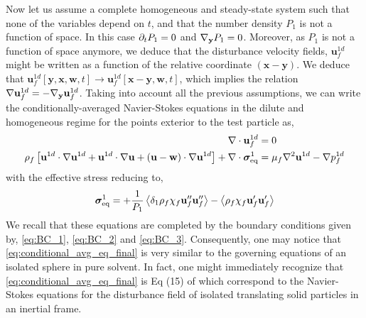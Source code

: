 Now let us assume a complete homogeneous and steady-state system such that none of the variables depend on $t$, and that the number density $P_1$ is not a function of space. 
In this case $\partial_t P_1 = 0$ and ${\mathbf{\nabla}_\textbf{y}} P_1 = 0$.
Moreover, as $P_1$ is not a function of space anymore, we deduce that the disturbance velocity fields, $\textbf{u}_f^{1d}$ might be written as a function of the relative coordinate $(\textbf{x} - \textbf{y})$. 
We deduce that $\textbf{u}_f^{1d}[\textbf{y},\textbf{x},\textbf{w},t] \to \textbf{u}_f^{1d}[\textbf{x}-\textbf{y},\textbf{w},t]$, which implies the relation  $\mathbf{\nabla} \textbf{u}_f^{1d} = - {\mathbf{\nabla}_\textbf{y}} \textbf{u}^{1d}_f$.
Taking into account all the previous assumptions, we can write the conditionally-averaged Navier-Stokes equations in the dilute and homogeneous regime for the points exterior to the test particle as, 
\begin{align}
    \div \textbf{u}^{1d}_f &= 0 \\
    \rho_f \left[
        \textbf{u}^{1d}\cdot \grad\textbf{u}^{1d} 
        +  \textbf{u}^{1d}\cdot \grad\textbf{u} 
        +  (\textbf{u} - \textbf{w})\cdot \grad\textbf{u}^{1d}
    \right]
    + \div \bm\sigma^1_\text{eq}
    &=
        \mu_f \grad^2 \textbf{u}^{1d}  
        - \grad p_f^{1d} 
    \label{eq:conditional_avg_eq_final}
\end{align}
with the effective stress reducing to,
\begin{equation*}
    \bm\sigma^1_\text{eq}
    =
    + \frac{1}{P_1}\left<\delta_1\rho_f\chi_f\textbf{u}_f''\textbf{u}_f''\right>
    - \left<\rho_f\chi_f\textbf{u}_f'\textbf{u}_f'\right>
\end{equation*}
We recall that these equations are completed by the boundary conditions given by, \ref{eq:BC_1}, \ref{eq:BC_2} and \ref{eq:BC_3}.
Consequently, one may notice that \ref{eq:conditional_avg_eq_final} is very similar to the governing equations of an isolated sphere in pure solvent. 
In fact, one might immediately recognize that \ref{eq:conditional_avg_eq_final} is Eq (15) of \citep{maxey1983equation} which correspond to the Navier-Stokes equations for the disturbance field of isolated translating solid particles in an inertial frame. 
